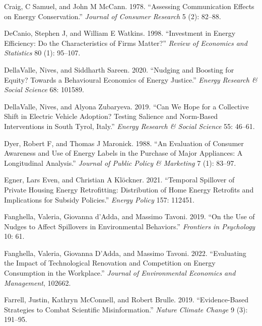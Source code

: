 \documentclass[
  11pt,
  captions=heading]{scrreport}
\newlength{\cslhangindent}
\newlength{\cslentryspacingunit} %
\newenvironment{CSLReferences}[2] %
 {%
  \setlength{\parindent}{0pt}
  \ifodd #1
  \let\oldpar\par
  \def\par{\hangindent=\cslhangindent\oldpar}
  \fi
  \setlength{\parskip}{#2\cslentryspacingunit}
 }%
 {}
\begin{document}
\begin{CSLReferences}{1}{0}
\leavevmode{}%
Craig, C Samuel, and John M McCann. 1978. {``Assessing Communication
Effects on Energy Conservation.''} \emph{Journal of Consumer Research} 5
(2): 82--88.

\leavevmode{}%
DeCanio, Stephen J, and William E Watkins. 1998. {``Investment in Energy
Efficiency: Do the Characteristics of Firms Matter?''} \emph{Review of
Economics and Statistics} 80 (1): 95--107.

\leavevmode{}%
DellaValle, Nives, and Siddharth Sareen. 2020. {``Nudging and Boosting
for Equity? Towards a Behavioural Economics of Energy Justice.''}
\emph{Energy Research \& Social Science} 68: 101589.

\leavevmode{}%
DellaValle, Nives, and Alyona Zubaryeva. 2019. {``Can We Hope for a
Collective Shift in Electric Vehicle Adoption? Testing Salience and
Norm-Based Interventions in South Tyrol, Italy.''} \emph{Energy Research
\& Social Science} 55: 46--61.

\leavevmode{}%
Dyer, Robert F, and Thomas J Maronick. 1988. {``An Evaluation of
Consumer Awareness and Use of Energy Labels in the Purchase of Major
Appliances: A Longitudinal Analysis.''} \emph{Journal of Public Policy
\& Marketing} 7 (1): 83--97.

\leavevmode{}%
Egner, Lars Even, and Christian A Klöckner. 2021. {``Temporal Spillover
of Private Housing Energy Retrofitting: Distribution of Home Energy
Retrofits and Implications for Subsidy Policies.''} \emph{Energy Policy}
157: 112451.

\leavevmode{}%
Fanghella, Valeria, Giovanna d'Adda, and Massimo Tavoni. 2019. {``On the
Use of Nudges to Affect Spillovers in Environmental Behaviors.''}
\emph{Frontiers in Psychology} 10: 61.

\leavevmode{}%
Fanghella, Valeria, Giovanna D'Adda, and Massimo Tavoni. 2022.
{``Evaluating the Impact of Technological Renovation and Competition on
Energy Consumption in the Workplace.''} \emph{Journal of Environmental
Economics and Management}, 102662.

\leavevmode{}%
Farrell, Justin, Kathryn McConnell, and Robert Brulle. 2019.
{``Evidence-Based Strategies to Combat Scientific Misinformation.''}
\emph{Nature Climate Change} 9 (3): 191--95.


\end{CSLReferences}
\end{document}
